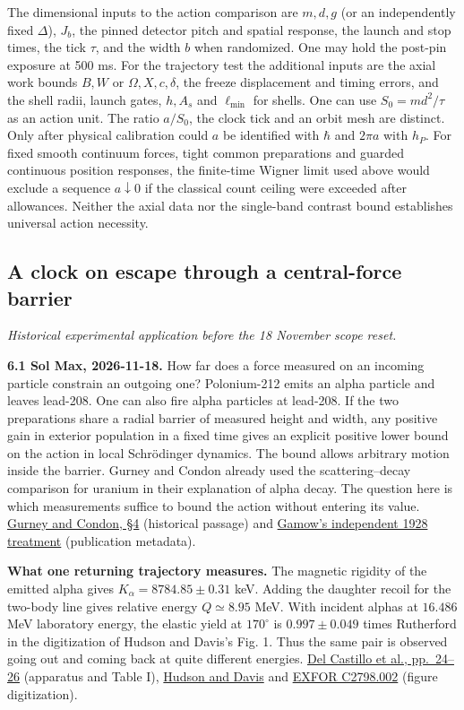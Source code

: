 \documentclass[11pt,a4paper]{article}
\begin{document}
The dimensional inputs to the action comparison are \(m,d,g\) (or an
independently fixed \(\Delta\)), \(J_b\), the pinned detector pitch and
spatial response, the launch and stop times, the tick \(\tau\), and the
width \(b\) when randomized. One may hold the post-pin exposure at 500
ms. For the trajectory test the additional inputs are the axial work
bounds \(B,W\) or \(\Omega,X,c,\delta\), the freeze displacement and
timing errors, and the shell radii, launch gates, \(h,A_s\) and
\(\ell_{\min}\) for shells. One can use \(S_0=md^2/\tau\) as an action
unit. The ratio \(a/S_0\), the clock tick and an orbit mesh are
distinct. Only after physical calibration could \(a\) be identified with
\(\hbar\) and \(2\pi a\) with \(h_P\). For fixed smooth continuum
forces, tight common preparations and guarded continuous position
responses, the finite-time Wigner limit used above would exclude a
sequence \(a\downarrow0\) if the classical count ceiling were exceeded
after allowances. Neither the axial data nor the single-band contrast
bound establishes universal action necessity.

\subsection{A clock on escape through a central-force
barrier}\label{a-clock-on-escape-through-a-central-force-barrier}

\emph{Historical experimental application before the 18 November scope
reset.}

\textbf{6.1 Sol Max, 2026-11-18.} How far does a force measured on an
incoming particle constrain an outgoing one? Polonium-212 emits an alpha
particle and leaves lead-208. One can also fire alpha particles at
lead-208. If the two preparations share a radial barrier of measured
height and width, any positive gain in exterior population in a fixed
time gives an explicit positive lower bound on the action in local
Schrödinger dynamics. The bound allows arbitrary motion inside the
barrier. Gurney and Condon already used the scattering--decay comparison
for uranium in their explanation of alpha decay. The question here is
which measurements suffice to bound the action without entering its
value. \href{https://doi.org/10.1103/PhysRev.33.127}{Gurney and Condon,
§4} (historical passage) and
\href{https://doi.org/10.1007/BF01343196}{Gamow's independent 1928
treatment} (publication metadata).

\textbf{What one returning trajectory measures.} The magnetic rigidity
of the emitted alpha gives \(K_\alpha=8784.85\pm0.31\) keV. Adding the
daughter recoil for the two-body line gives relative energy
\(Q\simeq8.95\) MeV. With incident alphas at \(16.486\) MeV laboratory
energy, the elastic yield at \(170^\circ\) is \(0.997\pm0.049\) times
Rutherford in the digitization of Hudson and Davis's Fig. 1. Thus the
same pair is observed going out and coming back at quite different
energies.
\href{https://rmf.smf.mx/ojs/index.php/rmf/article/download/975/738}{Del
Castillo et al., pp.~24--26} (apparatus and Table I),
\href{https://doi.org/10.1103/PhysRevC.9.1521}{Hudson and Davis} and
\href{https://github.com/IAEA-NDS/exfor_master/blob/d3e392e3e86a1c20e9094451d1e80a95fff5eaac/exforall/C27/C2798.x4\#L53}{EXFOR
C2798.002} (figure digitization).
\end{document}
